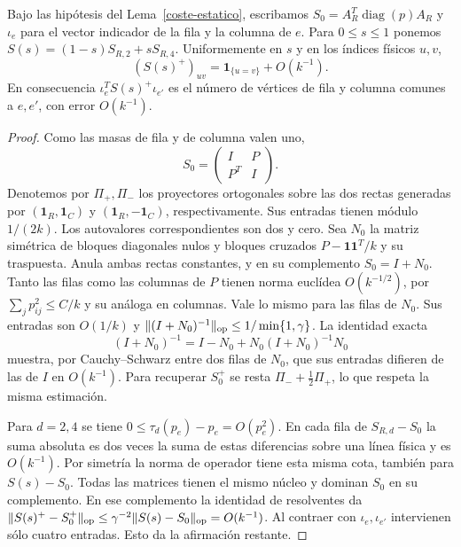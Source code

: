 \begin{lema}\label{coste-inversa}
Bajo las hipótesis del Lema~\ref{coste-estatico}, escribamos
$S_0=A_R^T\operatorname{diag}(p)A_R$ y $\iota_e$ para el vector indicador de la fila y la columna de
$e$.
Para $0\le s\le1$ ponemos
$S(s)=(1-s)S_{R,2}+sS_{R,4}$. Uniformemente en $s$ y en los índices físicos $u,v$,
\[
 (S(s)^+)_{uv}=\mathbf1_{\{u=v\}}+O(k^{-1}).
\]
En consecuencia $\iota_e^TS(s)^+\iota_{e'}$ es el número de vértices de fila y columna comunes a
$e,e'$, con
error $O(k^{-1})$.
\end{lema}
\begin{proof}
Como las masas de fila y de columna valen uno,
\[
 S_0=\begin{pmatrix}I&P\\P^T&I\end{pmatrix}.
\]
Denotemos por $\Pi_+,\Pi_-$ los proyectores ortogonales sobre las dos rectas generadas por
$(\mathbf1_R,\mathbf1_C)$ y $(\mathbf1_R,-\mathbf1_C)$, respectivamente. Sus entradas tienen módulo
$1/(2k)$. Los autovalores correspondientes son dos y cero. Sea $N_0$ la matriz simétrica de bloques
diagonales nulos y bloques cruzados $P-\mathbf1\mathbf1^T/k$ y su traspuesta. Anula ambas rectas
constantes, y en su complemento $S_0=I+N_0$. Tanto las filas como las columnas de $P$ tienen norma
euclídea $O(k^{-1/2})$, por $\sum_jp_{ij}^2\le C/k$ y su análoga en columnas. Vale lo mismo para las
filas de $N_0$. Sus entradas son $O(1/k)$ y $\|(I+N_0)^{-1}\|_{\rm op}\le1/\min\{1,\gamma\}$. La
identidad exacta
\[
 (I+N_0)^{-1}= I-N_0+N_0(I+N_0)^{-1}N_0
\]
muestra, por Cauchy--Schwarz entre dos filas de $N_0$, que sus entradas difieren de las de $I$ en
$O(k^{-1})$. Para recuperar $S_0^+$ se resta $\Pi_-+\tfrac12\Pi_+$, lo que respeta la misma
estimación.

Para $d=2,4$ se tiene $0\le\tau_d(p_e)-p_e=O(p_e^2)$. En cada fila de $S_{R,d}-S_0$ la suma absoluta
es dos veces la suma de estas diferencias sobre una línea física y es $O(k^{-1})$. Por simetría la
norma de operador tiene esta misma cota, también para $S(s)-S_0$. Todas las matrices tienen el mismo
núcleo y dominan $S_0$ en su complemento. En ese complemento la identidad de resolventes da
$\|S(s)^+-S_0^+\|_{\rm op}\le\gamma^{-2}\|S(s)-S_0\|_{\rm op}=O(k^{-1})$.
Al contraer con $\iota_e,\iota_{e'}$ intervienen sólo cuatro entradas. Esto da la afirmación restante.
\end{proof}

